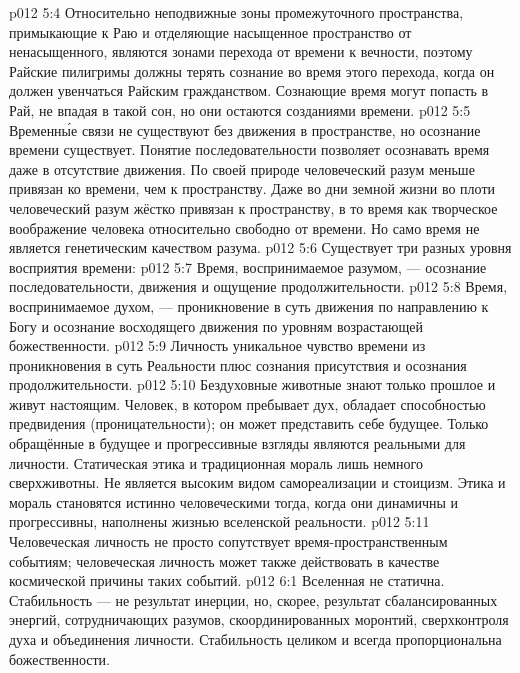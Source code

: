 \vs p012 5:4 Относительно неподвижные зоны промежуточного пространства, примыкающие к Раю и отделяющие насыщенное пространство от ненасыщенного, являются зонами перехода от времени к вечности, поэтому Райские пилигримы должны терять сознание во время этого перехода, когда он должен увенчаться Райским гражданством. Сознающие время  могут попасть в Рай, не впадая в такой сон, но они остаются созданиями времени.
\vs p012 5:5 \pc Временн\'ые связи не существуют без движения в пространстве, но осознание времени существует. Понятие последовательности позволяет осознавать время даже в отсутствие движения. По своей природе человеческий разум меньше привязан ко времени, чем к пространству. Даже во дни земной жизни во плоти человеческий разум жёстко привязан к пространству, в то время как творческое воображение человека относительно свободно от времени. Но само время не является генетическим качеством разума.
\vs p012 5:6 \pc Существует три разных уровня восприятия времени:
\vs p012 5:7 Время, воспринимаемое разумом, --- осознание последовательности, движения и ощущение продолжительности.
\vs p012 5:8 Время, воспринимаемое духом, --- проникновение в суть движения по направлению к Богу и осознание восходящего движения по уровням возрастающей божественности.
\vs p012 5:9 Личность  уникальное чувство времени из проникновения в суть Реальности плюс сознания присутствия и осознания продолжительности.
\vs p012 5:10 \pc Бездуховные животные знают только прошлое и живут настоящим. Человек, в котором пребывает дух, обладает способностью предвидения (проницательности); он может представить себе будущее. Только обращённые в будущее и прогрессивные взгляды являются реальными для личности. Статическая этика и традиционная мораль лишь немного сверхживотны. Не является высоким видом самореализации и стоицизм. Этика и мораль становятся истинно человеческими тогда, когда они динамичны и прогрессивны, наполнены жизнью вселенской реальности.
\vs p012 5:11 Человеческая личность не просто сопутствует время\hyp{}пространственным событиям; человеческая личность может также действовать в качестве космической причины таких событий.
\vs p012 6:1 Вселенная не статична. Стабильность --- не результат инерции, но, скорее, результат сбалансированных энергий, сотрудничающих разумов, скоординированных моронтий, сверхконтроля духа и объединения личности. Стабильность целиком и всегда пропорциональна божественности.
